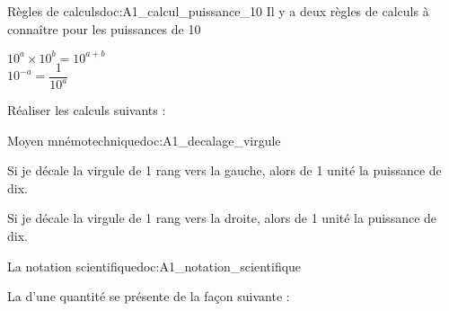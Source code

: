 \vspace*{-8pt}
\begin{doc}{Règles de calculs}{doc:A1_calcul_puissance_10}
  Il y a deux règles de calculs à connaître pour les puissances de 10
  \begin{encart}
    \pointCyan $10^a \times 10^b = 10^{a + b}$ \\   
    \pointCyan $10^{-a} = \dfrac{1}{10^a}$
  \end{encart}
\end{doc}


\numeroQuestion Réaliser les calculs suivants :\\[8pt]


\vspace*{-8pt}
\begin{doc}{Moyen mnémotechnique}{doc:A1_decalage_virgule}
  \begin{listePoints}
    \item Si je décale la virgule de 1 rang vers la gauche, alors
     de 1 unité la puissance de dix. 
    \item Si je décale la virgule de 1 rang vers la droite, alors
     de 1 unité la puissance de dix. 
  \end{listePoints}
\end{doc}


\newpage
\vspace*{-36pt}

\begin{doc}{La notation scientifique}{doc:A1_notation_scientifique}
  \begin{encart}
  La  d'une quantité se présente de la façon suivante :
  \begin{center}
    \qq{}
    \qq{}
  \end{center}
  \vspace*{-30pt} \hspace*{4pt}
  \end{encart}
\end{doc}

